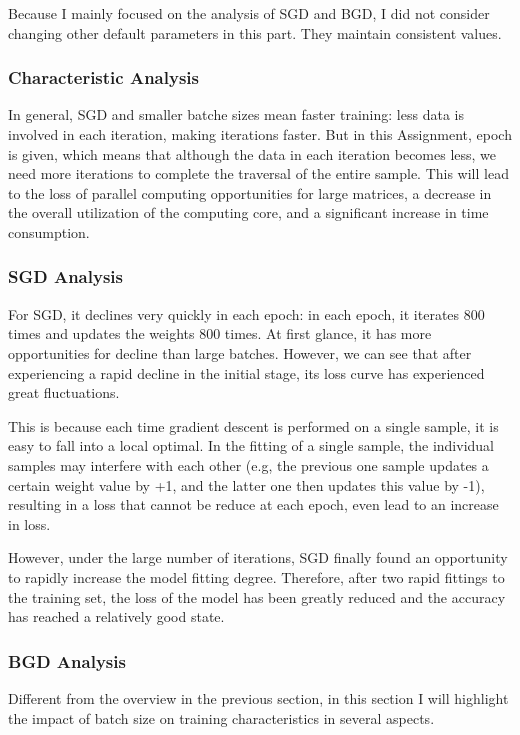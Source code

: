 Because I mainly focused on the analysis of SGD and BGD, I did not consider changing other default parameters in this part.
They maintain consistent values.

\subsubsection{Characteristic Analysis}

In general, SGD and smaller batche sizes mean faster training: less data is involved in each iteration, making iterations faster.
But in this Assignment, epoch is given, which means that although the data in each iteration becomes less, we need more iterations to complete the traversal of the entire sample.
This will lead to the loss of parallel computing opportunities for large matrices, a decrease in the overall utilization of the computing core, and a significant increase in time consumption.

\subsubsection{SGD Analysis}

For SGD, it declines very quickly in each epoch: in each epoch, it iterates 800 times and updates the weights 800 times. At first glance, it has more opportunities for decline than large batches. However, we can see that after experiencing a rapid decline in the initial stage, its loss curve has experienced great fluctuations.

This is because each time gradient descent is performed on a single sample, it is easy to fall into a local optimal.
In the fitting of a single sample, the individual samples may interfere with each other (e.g, the previous one sample updates a certain weight value by +1, and the latter one then updates this value by -1),
resulting in a loss that cannot be reduce at each epoch, even lead to an increase in loss.

However, under the large number of iterations, SGD finally found an opportunity to rapidly increase the model fitting degree.
Therefore, after two rapid fittings to the training set, the loss of the model has been greatly reduced and the accuracy has reached a relatively good state.

\subsubsection{BGD Analysis}

Different from the overview in the previous section, in this section I will highlight the impact of batch size on training characteristics in several aspects.

